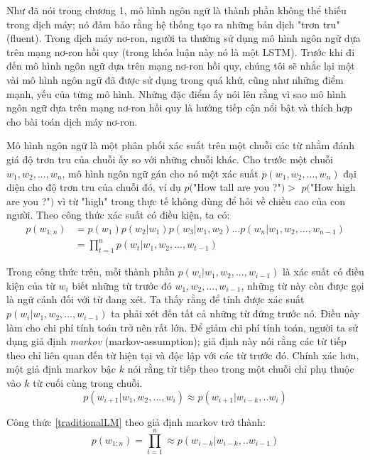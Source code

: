 Như đã nói trong chương 1, mô hình ngôn ngữ là thành phần không thể thiếu trong dịch máy; nó đảm bảo rằng hệ thống tạo ra những bản dịch "trơn tru" (fluent). Trong dịch máy nơ-ron, người ta thường sử dụng mô hình ngôn ngữ dựa trên mạng nơ-ron hồi quy (trong khóa luận này nó là một LSTM). Trước khi đi đến mô hình ngôn ngữ dựa trên mạng nơ-ron hồi quy, chúng tôi sẽ nhắc lại một vài mô hình ngôn ngữ đã được sử dụng trong quá khứ, cũng như những điểm mạnh, yếu của từng mô hình. Những đặc điểm ấy nói lên rằng vì sao mô hình ngôn ngữ dựa trên mạng nơ-ron hồi quy là hướng tiếp cận nổi bật và thích hợp cho bài toán dịch máy nơ-ron.

Mô hình ngôn ngữ là một phân phối xác suất trên một chuỗi các từ nhằm đánh giá độ trơn tru của chuỗi ấy so với những chuỗi khác. Cho trước một chuỗi $w_1,w_2,...,w_n$, mô hình ngôn ngữ gán cho nó một xác suất $p(w_1,w_2,...,w_n)$ đại diện cho độ trơn tru của chuỗi đó, ví dụ $p($"How tall are you ?"$) >$ $p($"How high are you ?"$)$ vì từ "high" trong thực tế không dùng để hỏi về chiều cao của con người. Theo công thức xác suất có điều kiện, ta có:
\begin{equation} \label{traditionalLM}
\begin{split}
	p(w_{1:n}) &= p(w_1)p(w_2|w_1)p(w_3|w_1,w_2)...p(w_n|w_1,w_2,...,w_{n-1}) \\
				&= \prod_{t=1}^{n} p(w_t|w_1,w_2,...,w_{t-1})
\end{split}
\end{equation}
 
Trong công thức trên, mỗi thành phần $p(w_i|w_1,w_2,...,w_{i-1})$ là xác suất có điều kiện của từ $w_i$ biết những từ trước đó $w_1,w_2,...,w_{i-1}$, những từ này còn được gọi là ngữ cảnh đối với từ đang xét. Ta thấy rằng để tính được xác suất $p(w_i|w_1,w_2,...,w_{i-1})$ ta phải xét đến tất cả những từ đứng trước nó. Điều này làm cho chi phí tính toán trở nên rất lớn. Để giảm chi phí tính toán, người ta sử dụng giả định \textit{markov} (markov-assumption); giả định này nói rằng các từ tiếp theo chỉ liên quan đến từ hiện tại và độc lập với các từ trước đó. Chính xác hơn, một giả định markov bậc $k$ nói rằng từ tiếp theo trong một chuỗi chỉ phụ thuộc vào $k$ từ cuối cùng trong chuỗi.
\begin{equation} \label{markovAssumption}
	p(w_{i+1}|w_1,w_2,...,w_{i}) \approx p(w_{i+1}|w_{i-k},..w_{i})
\end{equation}

Công thức \ref{traditionalLM} theo giả định markov trở thành:
\begin{equation} \label{traditionalLM}
	p(w_{1:n}) = \prod_{t=1}^{n} \approx p(w_{i-k}|w_{i-k},..w_{i-1})
\end{equation}


